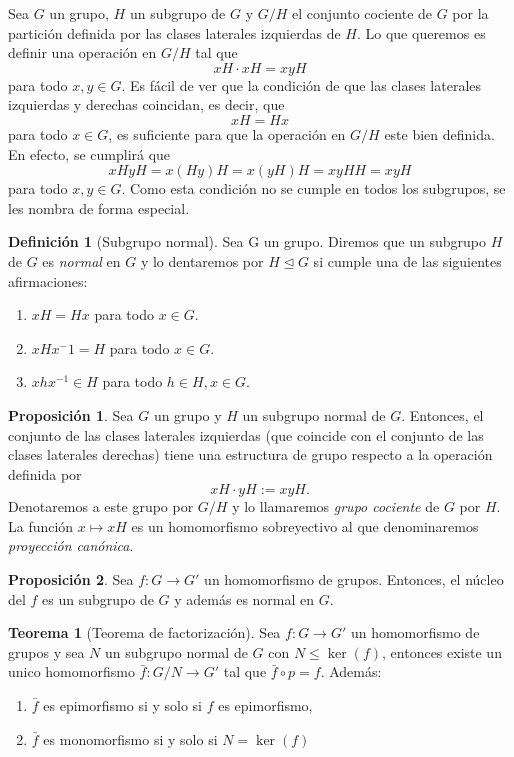 \documentclass[12pt]{book}
\theoremstyle{definition}
\newtheorem{defi}{Definición}[section]
\newtheorem{teor}{Teorema}[section]
\newtheorem{prop}{Proposición}[section]
\begin{document}
Sea $G$ un grupo, $H$ un subgrupo de $G$ y $G/H$ el conjunto cociente de $G$ por la partición definida por las clases laterales izquierdas de $H$. Lo que queremos es definir una operación en $G/H$ tal que
$$xH\cdot xH=xyH$$
para todo $x,y\in G$. Es fácil de ver que la condición de que las clases laterales izquierdas y derechas coincidan, es decir, que
$$xH=Hx$$
para todo $x\in G$, es suficiente para que la operación en $G/H$ este bien definida. En efecto, se cumplirá que
$$xHyH=x(Hy)H=x(yH)H=xyHH=xyH$$
para todo $x,y\in G$. Como esta condición no se cumple en todos los subgrupos, se les nombra de forma especial.

\begin{defi}[Subgrupo normal]
Sea G un grupo. Diremos que un subgrupo $H$ de $G$ es \textit{normal} en $G$ y lo dentaremos por $H\unlhd G$ si cumple una de las siguientes afirmaciones:
\begin{enumerate}
\item $xH=Hx$ para todo $x\in G$.
\item $xHx^-1=H$ para todo $x\in G$.
\item $xhx^{-1}\in H$ para todo $h\in H, x\in G$.
\end{enumerate}
\end{defi}

\begin{prop}
Sea $G$ un grupo y $H$ un subgrupo normal de $G$. Entonces, el conjunto de las clases laterales izquierdas (que coincide con el conjunto de las clases laterales derechas) tiene una estructura de grupo respecto a la operación definida por
$$xH\cdot yH:= xyH.$$
Denotaremos a este grupo por $G/H$ y lo llamaremos \textit{grupo cociente} de $G$ por $H$. La función $x\mapsto xH$ es un homomorfismo sobreyectivo al que denominaremos \textit{proyección canónica}.
\end{prop}

\begin{prop}
Sea $f:G\rightarrow G'$ un homomorfismo de grupos. Entonces, el núcleo del $f$ es un subgrupo de $G$ y además es normal en $G$.
\end{prop}

\begin{teor}[Teorema de factorización]
Sea  $f:G\rightarrow G'$ un homomorfismo de grupos y sea $N$ un subgrupo normal de $G$ con $N\leq \ker(f)$, entonces existe un unico homomorfismo $\bar{f}:G/N\rightarrow G'$ tal que $\bar{f}\circ p=f$. Además:
\begin{enumerate}
\item $\bar{f}$ es epimorfismo si y solo si $f$ es epimorfismo,
\item$\bar{f}$ es monomorfismo si y solo si $N=\ker(f)$
\end{enumerate}
\end{teor}
\end{document}
